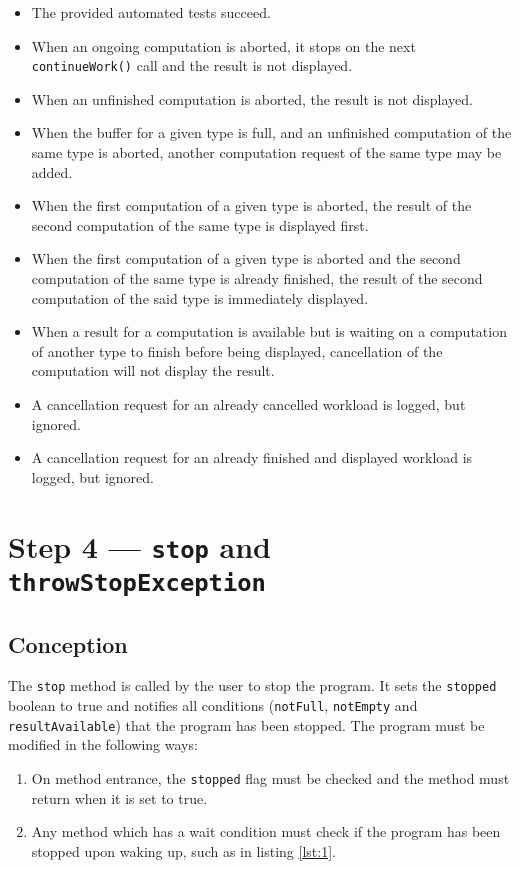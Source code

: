 \documentclass{article}
\begin{document}
    \begin{itemize}
        \item The provided automated tests succeed.
        \item When an ongoing computation is aborted, it stops on the next \texttt{continueWork()} call and the result is not displayed.
        \item When an unfinished computation is aborted, the result is not displayed.
        \item When the buffer for a given type is full, and an unfinished computation of the same type is aborted, another computation request of the same type may be added.
        \item When the first computation of a given type is aborted, the result of the second computation of the same type is displayed first.
        \item When the first computation of a given type is aborted and the second computation of the same type is already finished, the result of the second computation of the said type is immediately displayed.
        \item When a result for a computation is available but is waiting on a computation of another type to finish before being displayed, cancellation of the computation will not display the result.
        \item A cancellation request for an already cancelled workload is logged, but ignored.
        \item A cancellation request for an already finished and displayed workload is logged, but ignored.
    \end{itemize}

    \pagebreak

    \section*{Step 4 --- \texttt{stop} and \texttt{throwStopException}}

    \subsection*{Conception}

    The \texttt{stop} method is called by the user to stop the program.
    It sets the \texttt{stopped} boolean to true and notifies all conditions (\texttt{notFull}, \texttt{notEmpty} and \texttt{resultAvailable}) that the program has been stopped.
    The program must be modified in the following ways:
    \begin{enumerate}
        \item On method entrance, the \texttt{stopped} flag must be checked and the method must return when it is set to true.
        \item Any method which has a wait condition must check if the program has been stopped upon waking up, such as in listing \ref{lst:1}.
    \end{enumerate}
\end{document}
